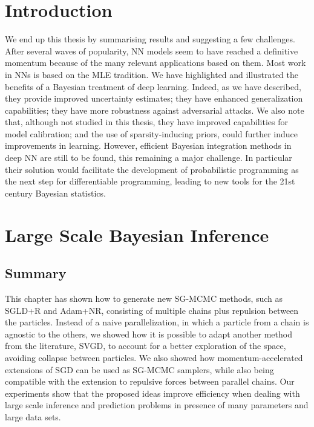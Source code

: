 

\section{Introduction}


We end up this thesis by summarising results and suggesting a few challenges.
After several waves of popularity, NN models seem to 
have reached a definitive momentum because of the many relevant applications
based on them. Most work in NNs is based on the MLE tradition.
We have highlighted and illustrated the benefits of a Bayesian treatment of deep learning. Indeed, as we have described,
they provide improved uncertainty estimates;
they have enhanced generalization capabilities; 
they have more robustness against adversarial attacks.
We also note that, although not studied in this thesis, 
they have improved capabilities for model calibration;
and the use of sparsity-inducing priors, could further induce 
improvements in learning. 
However, efficient Bayesian integration methods in 
deep NN are 
still to be found, this remaining a major challenge.
In particular their solution would facilitate the
development of probabilistic programming \parencite{gordon2014probabilistic,carpenter2017stan,wood2014new}
as the next step for differentiable programming,
leading to new tools for the 21st century Bayesian 
statistics.


\section{Large Scale Bayesian Inference}\label{sec:conclusion_lsb}

\subsection{Summary}

This chapter has shown how to generate new SG-MCMC methods, such as SGLD+R and Adam+NR, consisting of multiple chains plus repulsion between the particles. Instead of a naive parallelization, in which a particle from a chain is agnostic to the others, we showed how it is possible to adapt another method from the literature, SVGD, to account for a better exploration of the space, avoiding collapse between particles. We also showed how momentum-accelerated extensions of SGD can be used as SG-MCMC samplers, while also being compatible with the extension to repulsive forces between parallel chains. Our 
experiments show that the proposed ideas improve efficiency when dealing 
with large scale inference and prediction problems in presence of many 
parameters and large data sets.

